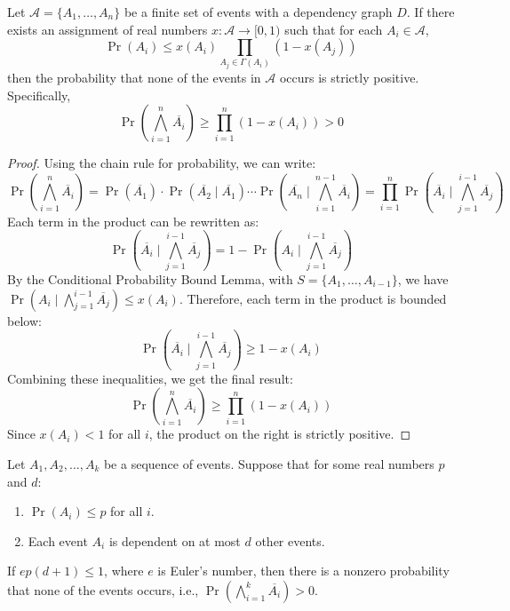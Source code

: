\begin{theorem}
Let $\mathcal{A}=\{A_{1},\ldots ,A_{n}\}$ be a finite set of events with a dependency graph $D$. If there exists an assignment of real numbers $x: \mathcal{A} \to [0,1)$ such that for each $A_i \in \mathcal{A}$,
$$\Pr(A_i) \leq x(A_i)\prod_{A_j \in \Gamma(A_i)}(1-x(A_j))$$
then the probability that none of the events in $\mathcal{A}$ occurs is strictly positive. Specifically,
$$\Pr\left(\bigwedge_{i=1}^n \overline{A_{i}}\right) \geq \prod_{i=1}^n (1-x(A_{i})) > 0$$
\end{theorem}

\begin{proof}
Using the chain rule for probability, we can write:
$$\Pr\left(\bigwedge_{i=1}^n \overline{A_i}\right) = \Pr(\overline{A_1}) \cdot \Pr(\overline{A_2} \mid \overline{A_1}) \cdots \Pr\left(\overline{A_n} \mid \bigwedge_{i=1}^{n-1} \overline{A_i}\right) = \prod_{i=1}^n \Pr\left(\overline{A_i} \mid \bigwedge_{j=1}^{i-1} \overline{A_j}\right)$$
Each term in the product can be rewritten as:
$$\Pr\left(\overline{A_i} \mid \bigwedge_{j=1}^{i-1} \overline{A_j}\right) = 1 - \Pr\left(A_i \mid \bigwedge_{j=1}^{i-1} \overline{A_j}\right)$$
By the Conditional Probability Bound Lemma, with $S = \{A_1, \ldots, A_{i-1}\}$, we have $\Pr\left(A_i \mid \bigwedge_{j=1}^{i-1} \overline{A_j}\right) \leq x(A_i)$.
Therefore, each term in the product is bounded below:
$$\Pr\left(\overline{A_i} \mid \bigwedge_{j=1}^{i-1} \overline{A_j}\right) \geq 1 - x(A_i)$$
Combining these inequalities, we get the final result:
$$\Pr\left(\bigwedge_{i=1}^n \overline{A_i}\right) \geq \prod_{i=1}^n (1 - x(A_i))$$
Since $x(A_i) < 1$ for all $i$, the product on the right is strictly positive.
\end{proof}

\begin{theorem}
Let $A_1, A_2, \ldots, A_k$ be a sequence of events. Suppose that for some real numbers $p$ and $d$:
\begin{enumerate}
    \item $\Pr(A_i) \leq p$ for all $i$.
    \item Each event $A_i$ is dependent on at most $d$ other events.
\end{enumerate}
If $ep(d+1) \leq 1$, where $e$ is Euler's number, then there is a nonzero probability that none of the events occurs, i.e., $\Pr(\bigwedge_{i=1}^k \overline{A_i}) > 0$.
\end{theorem}

